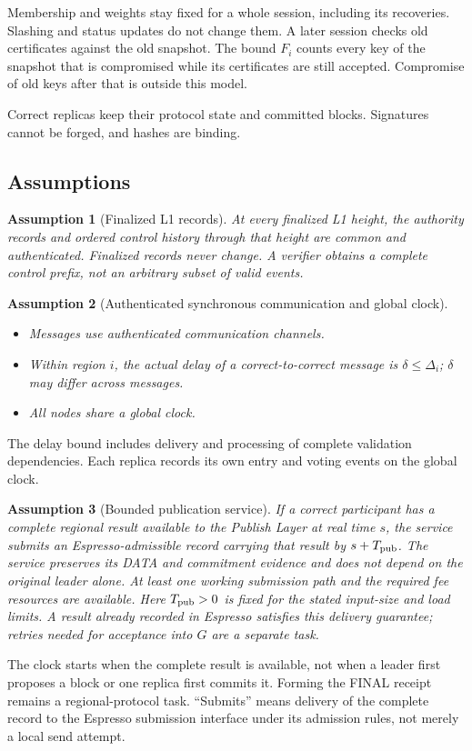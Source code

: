 \documentclass[11pt,a4paper]{article}
\newtheorem{assumption}[assumption]{Assumption}
\newcounter{protocol}
\begin{document}
Membership and weights stay fixed for a whole session, including its
recoveries. Slashing and status updates do not change them. A later
session checks old certificates against the old snapshot. The bound
$F_i$ counts every key of the snapshot that is compromised while its
certificates are still accepted. Compromise of old keys after that is
outside this model.

Correct replicas keep their protocol state and committed blocks.
Signatures cannot be forged, and hashes are binding.



\subsection{Assumptions}
\label{sec:assumptions}
\begin{assumption}[Finalized L1 records]
\label{ass:authority}
At every finalized L1 height, the authority records and ordered control
history through that height are common and authenticated. Finalized
records never change. A verifier obtains a complete control prefix,
not an arbitrary subset of valid events.
\end{assumption}

\begin{assumption}[Authenticated synchronous communication and global clock]
\label{ass:network}
\leavevmode\par
\begin{itemize}
\item Messages use authenticated communication channels.
\item Within region $i$, the actual delay of a correct-to-correct
message is $\delta\le\Delta_i$; $\delta$ may differ across messages.
\item All nodes share a global clock.
\end{itemize}
\end{assumption}
The delay bound includes delivery and processing of complete validation
dependencies. Each replica records its own entry and voting events on
the global clock.

\begin{assumption}[Bounded publication service]
\label{ass:publish}
If a correct participant has a complete regional result available to the
Publish Layer at real time $s$, the service submits an Espresso-admissible
record carrying that result by $s+T_{\rm pub}$. The service preserves its
DATA and commitment evidence and does not depend on the original leader
alone. At least one working submission path and the required fee resources
are available. Here $T_{\rm pub}>0$ is fixed for the stated input-size and load
limits. A result already recorded in Espresso satisfies this delivery
guarantee; retries needed for acceptance into $G$ are a separate task.
\end{assumption}
The clock starts when the complete result is available, not when a leader
first proposes a block or one replica first commits it. Forming the FINAL
receipt remains a regional-protocol task. ``Submits'' means delivery of the
complete record to the Espresso submission interface under its admission
rules, not merely a local send attempt.
\end{document}
